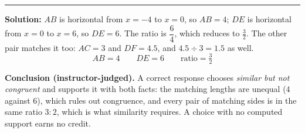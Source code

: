 \documentclass[12pt]{article}
\begin{document}
\noindent\rule{\linewidth}{0.2pt}


\textbf{Solution:} \quad $AB$ is horizontal from $x = -4$ to $x = 0$, so $AB = 4$; $DE$ is
horizontal from $x = 0$ to $x = 6$, so $DE = 6$. The ratio is $\dfrac{6}{4}$, which reduces to
$\tfrac{3}{2}$. The other pair matches it too: $AC = 3$ and $DF = 4.5$, and
$4.5 \div 3 = 1.5$ as well.
\[ \boxed{AB = 4 \qquad DE = 6 \qquad \text{ratio} = \tfrac{3}{2}} \]

\textbf{Conclusion (instructor-judged).} A correct response chooses \textit{similar but not
congruent} and supports it with both facts: the matching lengths are unequal ($4$ against $6$),
which rules out congruence, and every pair of matching sides is in the same ratio $3 : 2$, which
is what similarity requires. A choice with no computed support earns no credit.
\end{document}
